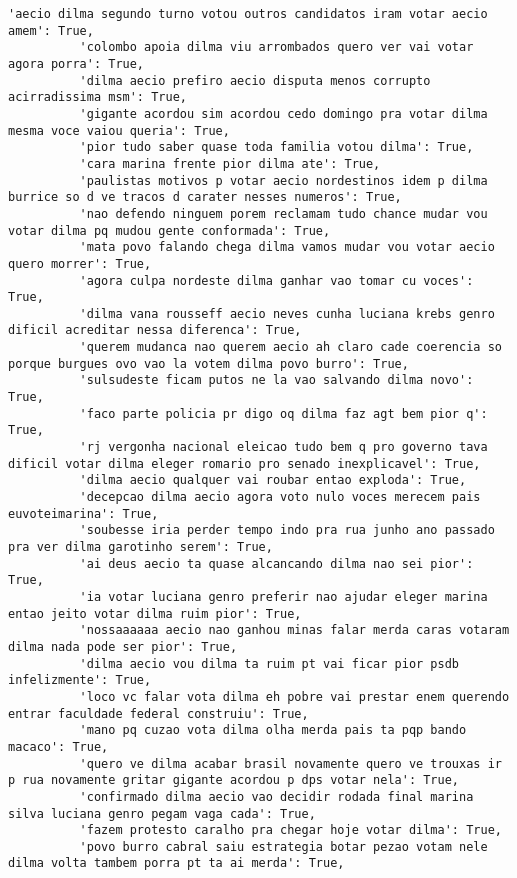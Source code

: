 \documentclass[11pt]{article}
\begin{document}
\begin{Verbatim}[commandchars=\\\{\}]
          'aecio dilma segundo turno votou outros candidatos iram votar aecio amem': True,
          'colombo apoia dilma viu arrombados quero ver vai votar agora porra': True,
          'dilma aecio prefiro aecio disputa menos corrupto acirradissima msm': True,
          'gigante acordou sim acordou cedo domingo pra votar dilma mesma voce vaiou queria': True,
          'pior tudo saber quase toda familia votou dilma': True,
          'cara marina frente pior dilma ate': True,
          'paulistas motivos p votar aecio nordestinos idem p dilma burrice so d ve tracos d carater nesses numeros': True,
          'nao defendo ninguem porem reclamam tudo chance mudar vou votar dilma pq mudou gente conformada': True,
          'mata povo falando chega dilma vamos mudar vou votar aecio quero morrer': True,
          'agora culpa nordeste dilma ganhar vao tomar cu voces': True,
          'dilma vana rousseff aecio neves cunha luciana krebs genro dificil acreditar nessa diferenca': True,
          'querem mudanca nao querem aecio ah claro cade coerencia so porque burgues ovo vao la votem dilma povo burro': True,
          'sulsudeste ficam putos ne la vao salvando dilma novo': True,
          'faco parte policia pr digo oq dilma faz agt bem pior q': True,
          'rj vergonha nacional eleicao tudo bem q pro governo tava dificil votar dilma eleger romario pro senado inexplicavel': True,
          'dilma aecio qualquer vai roubar entao exploda': True,
          'decepcao dilma aecio agora voto nulo voces merecem pais euvoteimarina': True,
          'soubesse iria perder tempo indo pra rua junho ano passado pra ver dilma garotinho serem': True,
          'ai deus aecio ta quase alcancando dilma nao sei pior': True,
          'ia votar luciana genro preferir nao ajudar eleger marina entao jeito votar dilma ruim pior': True,
          'nossaaaaaa aecio nao ganhou minas falar merda caras votaram dilma nada pode ser pior': True,
          'dilma aecio vou dilma ta ruim pt vai ficar pior psdb infelizmente': True,
          'loco vc falar vota dilma eh pobre vai prestar enem querendo entrar faculdade federal construiu': True,
          'mano pq cuzao vota dilma olha merda pais ta pqp bando macaco': True,
          'quero ve dilma acabar brasil novamente quero ve trouxas ir p rua novamente gritar gigante acordou p dps votar nela': True,
          'confirmado dilma aecio vao decidir rodada final marina silva luciana genro pegam vaga cada': True,
          'fazem protesto caralho pra chegar hoje votar dilma': True,
          'povo burro cabral saiu estrategia botar pezao votam nele dilma volta tambem porra pt ta ai merda': True,

\end{Verbatim}
\end{document}
